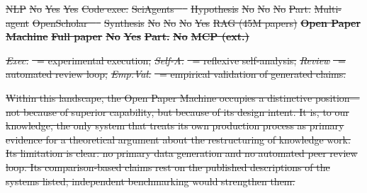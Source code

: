 \documentclass{article}
\providecommand{\DIFdeltex}[1]{{\protect\color{red}\sout{#1}}}                      %
\providecommand{\DIFdelFL}[1]{\DIFdel{#1}} %
\providecommand{\DIFdel}[1]{\texorpdfstring{\DIFdeltex{#1}}{}} %
\begin{document}
\DIFdelFL{NLP }%
\DIFdelFL{No }%
\DIFdelFL{Yes }%
\DIFdelFL{Yes }%
\DIFdelFL{Code exec. }%
\DIFdelFL{SciAgents \mbox{%
\citep{ghafarollahi2024sciagents} }\hskip0pt%
}%
\DIFdelFL{Hypothesis }%
\DIFdelFL{No }%
\DIFdelFL{No }%
\DIFdelFL{No }%
\DIFdelFL{Part. }%
\DIFdelFL{Multi-agent }%
\DIFdelFL{OpenScholar \mbox{%
\citep{asai2024openscholar} }\hskip0pt%
}%
\DIFdelFL{Synthesis }%
\DIFdelFL{No }%
\DIFdelFL{No }%
\DIFdelFL{No }%
\DIFdelFL{Yes }%
\DIFdelFL{RAG (45M papers) }%
\textbf{\DIFdelFL{Open Paper Machine}} %
\textbf{\DIFdelFL{Full paper}} %
\textbf{\DIFdelFL{No}} %
\textbf{\DIFdelFL{Yes}} %
\textbf{\DIFdelFL{Part.}} %
\textbf{\DIFdelFL{No}} %
\textbf{\DIFdelFL{MCP (ext.)}} %

\textit{\DIFdelFL{Exec.}}%
\DIFdelFL{~= experimental execution; }\textit{\DIFdelFL{Self-A.}}%
\DIFdelFL{~= reflexive self-analysis; }\textit{\DIFdelFL{Review}}%
\DIFdelFL{~= automated review loop; }\textit{\DIFdelFL{Emp.Val.}}%
\DIFdelFL{~= empirical validation of generated claims.
}%

\DIFdel{Within this landscape, the Open Paper Machine occupies a distinctive position---not because of superior capability, but because of its design intent. It is, to our knowledge, the only system that treats its own production process as primary evidence for a theoretical argument about the restructuring of knowledge work. Its limitation is clear: no primary data generation and no automated peer review loop. Its comparison-based claims rest on the published descriptions of the systems listed; independent benchmarking would strengthen them.
}%
\end{document}
